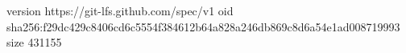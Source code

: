 version https://git-lfs.github.com/spec/v1
oid sha256:f29dc429c8406cd6c5554f384612b64a828a246db869c8d6a54e1ad008719993
size 431155
